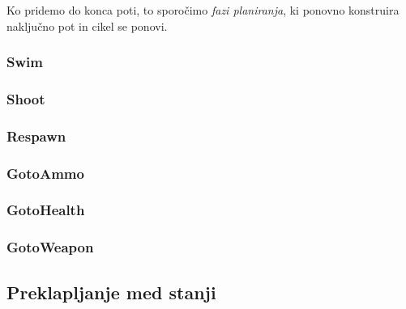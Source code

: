 \documentclass[a4paper,10pt]{article}
\begin{document}
Ko pridemo do konca poti, to sporočimo \textit{fazi planiranja}, ki ponovno konstruira naključno pot in cikel se ponovi. 
  
\subsubsection{Swim}
\subsubsection{Shoot}
\subsubsection{Respawn}
\subsubsection{GotoAmmo}
\subsubsection{GotoHealth}
\subsubsection{GotoWeapon}

\subsection{Preklapljanje med stanji}
\end{document}
